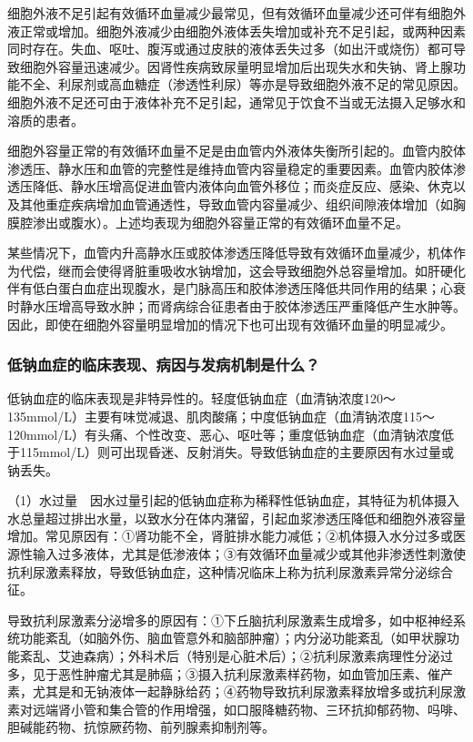 细胞外液不足引起有效循环血量减少最常见，但有效循环血量减少还可伴有细胞外液正常或增加。细胞外液减少由细胞外液体丢失增加或补充不足引起，或两种因素同时存在。失血、呕吐、腹泻或通过皮肤的液体丢失过多（如出汗或烧伤）都可导致细胞外容量迅速减少。因肾性疾病致尿量明显增加后出现失水和失钠、肾上腺功能不全、利尿剂或高血糖症（渗透性利尿）等亦是导致细胞外液不足的常见原因。细胞外液不足还可由于液体补充不足引起，通常见于饮食不当或无法摄入足够水和溶质的患者。

细胞外容量正常的有效循环血量不足是由血管内外液体失衡所引起的。血管内胶体渗透压、静水压和血管的完整性是维持血管内容量稳定的重要因素。血管内胶体渗透压降低、静水压增高促进血管内液体向血管外移位；而炎症反应、感染、休克以及其他重症疾病增加血管通透性，导致血管内容量减少、组织间隙液体增加（如胸膜腔渗出或腹水）。上述均表现为细胞外容量正常的有效循环血量不足。

某些情况下，血管内升高静水压或胶体渗透压降低导致有效循环血量减少，机体作为代偿，继而会使得肾脏重吸收水钠增加，这会导致细胞外总容量增加。如肝硬化伴有低白蛋白血症出现腹水，是门脉高压和胶体渗透压降低共同作用的结果；心衰时静水压增高导致水肿；而肾病综合征患者由于胶体渗透压严重降低产生水肿等。因此，即使在细胞外容量明显增加的情况下也可出现有效循环血量的明显减少。

\subsubsection{低钠血症的临床表现、病因与发病机制是什么？}

低钠血症的临床表现是非特异性的。轻度低钠血症（血清钠浓度120～135mmol/L）主要有味觉减退、肌肉酸痛；中度低钠血症（血清钠浓度115～120mmol/L）有头痛、个性改变、恶心、呕吐等；重度低钠血症（血清钠浓度低于115mmol/L）则可出现昏迷、反射消失。导致低钠血症的主要原因有水过量或钠丢失。

（1）水过量　因水过量引起的低钠血症称为稀释性低钠血症，其特征为机体摄入水总量超过排出水量，以致水分在体内潴留，引起血浆渗透压降低和细胞外液容量增加。常见原因有：①肾功能不全，肾脏排水能力减低；②机体摄入水分过多或医源性输入过多液体，尤其是低渗液体；③有效循环血量减少或其他非渗透性刺激使抗利尿激素释放，导致低钠血症，这种情况临床上称为抗利尿激素异常分泌综合征。

导致抗利尿激素分泌增多的原因有：①下丘脑抗利尿激素生成增多，如中枢神经系统功能紊乱（如脑外伤、脑血管意外和脑部肿瘤）；内分泌功能紊乱（如甲状腺功能紊乱、艾迪森病）；外科术后（特别是心脏术后）；②抗利尿激素病理性分泌过多，见于恶性肿瘤尤其是肺癌；③摄入抗利尿激素样药物，如血管加压素、催产素，尤其是和无钠液体一起静脉给药；④药物导致抗利尿激素释放增多或抗利尿激素对远端肾小管和集合管的作用增强，如口服降糖药物、三环抗抑郁药物、吗啡、胆碱能药物、抗惊厥药物、前列腺素抑制剂等。

